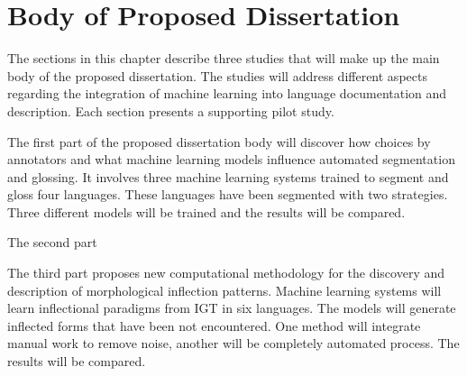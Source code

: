 \chapter{Body of Proposed Dissertation}
\label{chap:body}

The sections in this chapter describe three studies that will make up the main body of the proposed dissertation. The studies will address different aspects regarding the integration of machine learning into language documentation and description. %
Each section presents a supporting pilot study.

The first part of the proposed dissertation body will discover how choices by annotators and what machine learning models influence automated segmentation and glossing. It involves three machine learning systems trained to segment and gloss four languages. These languages have been segmented with two strategies. Three different models will be trained and the results will be compared.  

The second part 

The third part proposes new computational methodology for the discovery and description of morphological inflection patterns. Machine learning systems will learn inflectional paradigms from IGT in six languages. The models will generate inflected forms that have been not encountered. One method will integrate manual work to remove noise, another will be completely automated process. The results will be compared.




